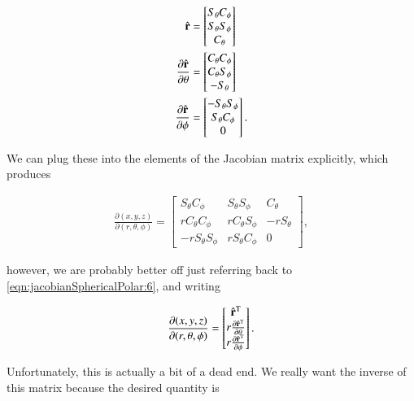 \begin{subequations}\label{eqn:jacobianSphericalPolar:6}
\begin{align}
\hat{\mathbf{r}} &= 
\begin{bmatrix}
S_\theta C_\phi \\
S_\theta S_\phi \\
C_\theta 
\end{bmatrix} \\
\frac{\partial {\hat{\mathbf{r}}}}{\partial {\theta}} &= 
\begin{bmatrix}
C_\theta C_\phi \\
C_\theta S_\phi \\
-S_\theta 
\end{bmatrix} \\
\frac{\partial {\hat{\mathbf{r}}}}{\partial {\phi}} &= 
\begin{bmatrix}
-S_\theta S_\phi \\
S_\theta C_\phi \\
0
\end{bmatrix} 
.
\end{align}
\end{subequations}

We can plug these into the elements of the Jacobian matrix explicitly, which produces

\begin{align}\label{eqn:jacobianSphericalPolar:7}
\frac{\partial (x,y,z)}{\partial (r,\theta,\phi)}
=
\begin{bmatrix} 
S_\theta C_\phi & S_\theta S_\phi & C_\theta \\
r C_\theta C_\phi & r C_\theta S_\phi & - r S_\theta \\
-r S_\theta S_\phi & rS_\theta C_\phi & 0
\end{bmatrix},
\end{align}

however, we are probably better off just referring back to \ref{eqn:jacobianSphericalPolar:6}, and writing 

\begin{align}\label{eqn:jacobianSphericalPolar:7a}
\frac{\partial (x,y,z)}{\partial (r,\theta,\phi)}
=
\begin{bmatrix} 
\hat{\mathbf{r}}^{\text{T}} \\
r \frac{\partial {\hat{\mathbf{r}}^{\text{T}}}}{\partial {\theta}} \\
r \frac{\partial {\hat{\mathbf{r}}^{\text{T}}}}{\partial {\phi}} 
\end{bmatrix}.
\end{align}

Unfortunately, this is actually a bit of a dead end.  We really want the inverse of this matrix because the desired quantity is

